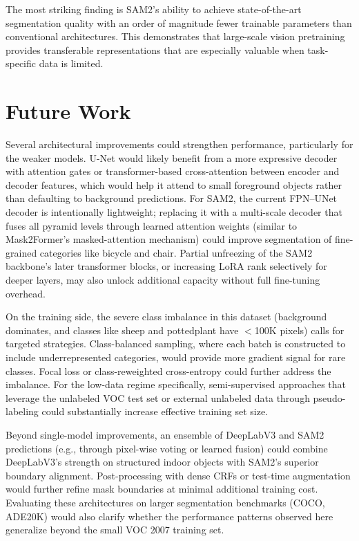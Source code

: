 \documentclass[11pt]{article}
\begin{document}
The most striking finding is SAM2's ability to achieve state-of-the-art segmentation quality with an order of magnitude fewer trainable parameters than conventional architectures. This demonstrates that large-scale vision pretraining provides transferable representations that are especially valuable when task-specific data is limited.

\section{Future Work}

Several architectural improvements could strengthen performance, particularly for the weaker models. U-Net would likely benefit from a more expressive decoder with attention gates or transformer-based cross-attention between encoder and decoder features, which would help it attend to small foreground objects rather than defaulting to background predictions. For SAM2, the current FPN--UNet decoder is intentionally lightweight; replacing it with a multi-scale decoder that fuses all pyramid levels through learned attention weights (similar to Mask2Former's masked-attention mechanism) could improve segmentation of fine-grained categories like bicycle and chair. Partial unfreezing of the SAM2 backbone's later transformer blocks, or increasing LoRA rank selectively for deeper layers, may also unlock additional capacity without full fine-tuning overhead.

On the training side, the severe class imbalance in this dataset (background dominates, and classes like sheep and pottedplant have $<$100K pixels) calls for targeted strategies. Class-balanced sampling, where each batch is constructed to include underrepresented categories, would provide more gradient signal for rare classes. Focal loss or class-reweighted cross-entropy could further address the imbalance. For the low-data regime specifically, semi-supervised approaches that leverage the unlabeled VOC test set or external unlabeled data through pseudo-labeling could substantially increase effective training set size.

Beyond single-model improvements, an ensemble of DeepLabV3 and SAM2 predictions (e.g., through pixel-wise voting or learned fusion) could combine DeepLabV3's strength on structured indoor objects with SAM2's superior boundary alignment. Post-processing with dense CRFs or test-time augmentation would further refine mask boundaries at minimal additional training cost. Evaluating these architectures on larger segmentation benchmarks (COCO, ADE20K) would also clarify whether the performance patterns observed here generalize beyond the small VOC 2007 training set.
\end{document}
